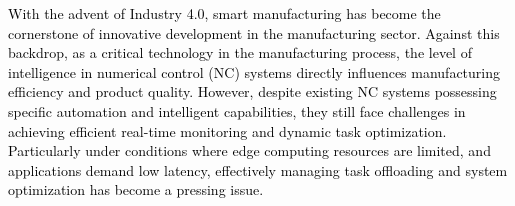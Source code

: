 \documentclass[preprint,12pt]{elsarticle}
\begin{document}
\textcolor{black}{With the advent of Industry 4.0, smart manufacturing has become the cornerstone of innovative development in the manufacturing sector\cite{sahoo2022smart}. Against this backdrop, as a critical technology in the manufacturing process, the level of intelligence in numerical control (NC) systems directly influences manufacturing efficiency and product quality\cite{rabiei2023comprehensive}. However, despite existing NC systems possessing specific automation and intelligent capabilities, they still face challenges in achieving efficient real-time monitoring and dynamic task optimization. Particularly under conditions where edge computing resources are limited, and applications demand low latency, effectively managing task offloading and system optimization has become a pressing issue.\cite{zhang2022dependent,avan2023state,chakraborty2022intelligent}}
\end{document}
